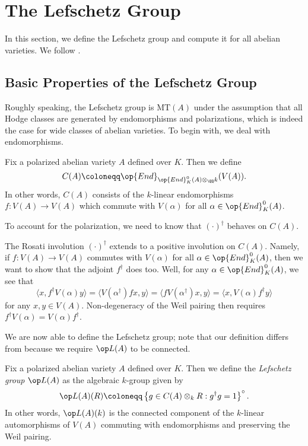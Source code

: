 \documentclass{article}
\begin{document}
\section{The Lefschetz Group}
In this section, we define the Lefschetz group and compute it for all abelian varieties. We follow \cite{milne-lefschetz-group}.

\subsection{Basic Properties of the Lefschetz Group}
Roughly speaking, the Lefschetz group is $\mathrm{MT}(A)$ under the assumption that all Hodge classes are generated by endomorphisms and polarizations, which is indeed the case for wide classes of abelian varieties. To begin with, we deal with endomorphisms.
\begin{definition}
	Fix a polarized abelian variety $A$ defined over $K$. Then we define
	\[C(A)\coloneqq\op{End}_{\op{End}^0_K(A)\otimes_\QQ k}(V(A)).\]
	In other words, $C(A)$ consists of the $k$-linear endomorphisms $f\colon V(A)\to V(A)$ which commute with $V(\alpha)$ for all $\alpha\in\op{End}^0_K(A)$.
\end{definition}
To account for the polarization, we need to know that $(\cdot)^\dagger$ behaves on $C(A)$.
\begin{remark}
	The Rosati involution $(\cdot)^\dagger$ extends to a positive involution on $C(A)$. Namely, if $f\colon V(A)\to V(A)$ commutes with $V(\alpha)$ for all $\alpha\in\op{End}^0_K(A)$, then we want to show that the adjoint $f^\dagger$ does too. Well, for any $\alpha\in\op{End}^0_K(A)$, we see that
	\[\langle x,f^\dagger V(\alpha)y\rangle=\langle V(\alpha^\dagger)fx,y\rangle=\langle fV(\alpha^\dagger)x,y\rangle=\langle x,V(\alpha)f^\dagger y\rangle\]
	for any $x,y\in V(A)$. Non-degeneracy of the Weil pairing then requires $f^\dagger V(\alpha)=V(\alpha)f^\dagger$.
\end{remark}
We are now able to define the Lefschetz group; note that our definition differs from \cite{milne-lefschetz-group} because we require $\op L(A)$ to be connected.
\begin{definition}
	Fix a polarized abelian variety $A$ defined over $K$. Then we define the \textit{Lefschetz group} $\op L(A)$ as the algebraic $k$-group given by
	\[\op L(A)(R)\coloneqq\left\{g\in C(A)\otimes_kR:g^\dagger g=1\right\}^\circ.\]
	In other words, $\op L(A)(k)$ is the connected component of the $k$-linear automorphisms of $V(A)$ commuting with endomorphisms and preserving the Weil pairing.
\end{definition}
\end{document}
